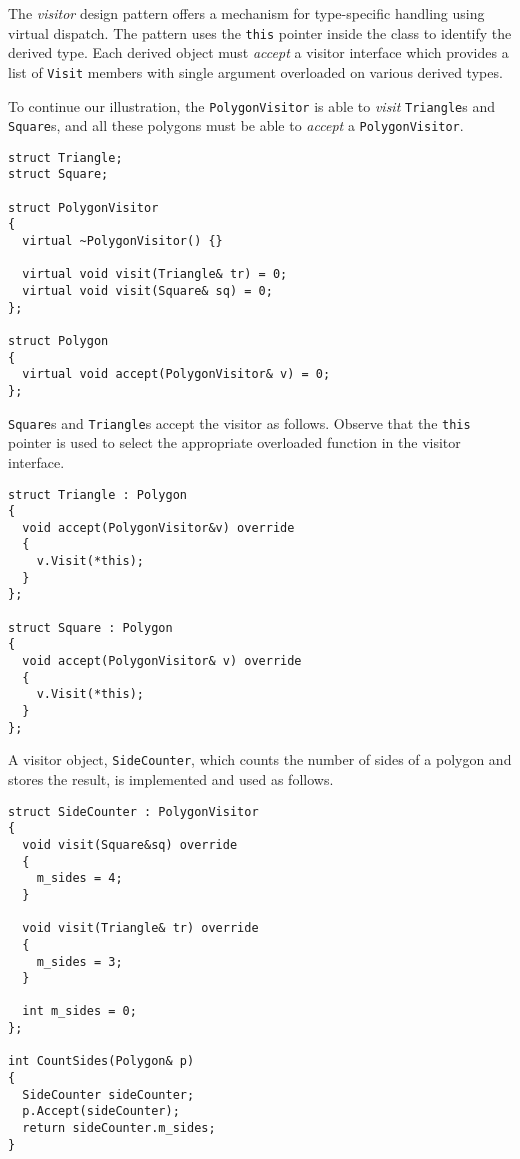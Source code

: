\documentclass[10pt,a4paper]{article}
\newcommand\mycode[1]{{\small\texttt{#1}}}
\begin{document}
The \emph{visitor} design pattern offers a mechanism for type-specific handling
using virtual dispatch. The pattern uses the \mycode{this} pointer inside the
class to identify the derived type. Each derived object must \emph{accept} a
visitor interface which provides a list of \mycode{Visit} members with single
argument overloaded on various derived types.

To continue our illustration, the \mycode{PolygonVisitor} is able to
\emph{visit} \mycode{Triangle}s and \mycode{Square}s, and all these polygons
must be able to \emph{accept} a \mycode{PolygonVisitor}.

{\small\begin{verbatim} 
struct Triangle; 
struct Square;

struct PolygonVisitor 
{ 
  virtual ~PolygonVisitor() {}

  virtual void visit(Triangle& tr) = 0; 
  virtual void visit(Square& sq) = 0;
};

struct Polygon 
{ 
  virtual void accept(PolygonVisitor& v) = 0; 
};\end{verbatim}}

\mycode{Square}s and \mycode{Triangle}s accept the visitor as follows. Observe
that the \mycode{this} pointer is used to select the appropriate overloaded
function in the visitor interface.

{\small\begin{verbatim} 
struct Triangle : Polygon 
{ 
  void accept(PolygonVisitor&v) override 
  { 
    v.Visit(*this); 
  } 
};

struct Square : Polygon 
{ 
  void accept(PolygonVisitor& v) override 
  {
    v.Visit(*this); 
  } 
};\end{verbatim}}

A visitor object, \mycode{SideCounter}, which counts the number of sides of a
polygon and stores the result, is implemented and used as follows.

{\small\begin{verbatim} 
struct SideCounter : PolygonVisitor 
{ 
  void visit(Square&sq) override 
  { 
    m_sides = 4; 
  }
  
  void visit(Triangle& tr) override 
  { 
    m_sides = 3; 
  }
  
  int m_sides = 0; 
};

int CountSides(Polygon& p) 
{ 
  SideCounter sideCounter; 
  p.Accept(sideCounter);
  return sideCounter.m_sides; 
}\end{verbatim}}

\newpage
\end{document}
